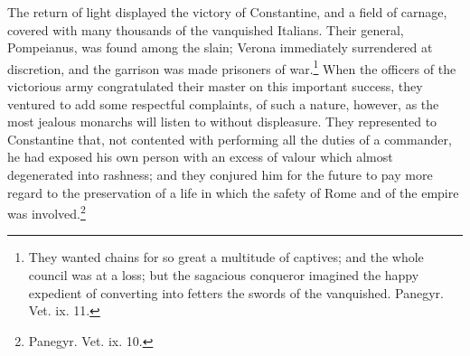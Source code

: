 The return of light displayed the victory of Constantine, and a field of carnage, covered with many thousands of the vanquished Italians. Their general, Pompeianus, was found among the slain; Verona immediately surrendered at discretion, and the garrison was made prisoners of war.\footnote{They wanted chains for so great a multitude of captives; and the whole council was at a loss; but the sagacious conqueror imagined the happy expedient of converting into fetters the swords of the vanquished. Panegyr. Vet. ix. 11.} When the officers of the victorious army congratulated their master on this important success, they ventured to add some respectful complaints, of such a nature, however, as the most jealous monarchs will listen to without displeasure. They represented to Constantine that, not contented with performing all the duties of a commander, he had exposed his own person with an excess of valour which almost degenerated into rashness; and they conjured him for the future to pay more regard to the preservation of a life in which the safety of Rome and of the empire was involved.\footnote{Panegyr. Vet. ix. 10.}

